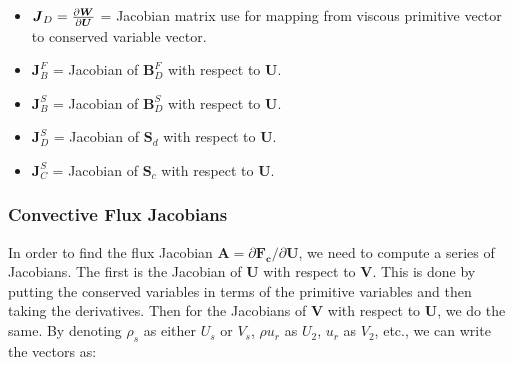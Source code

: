 \documentclass[10pt]{article}
\begin{document}
\begin{flushleft}
\begin{itemize}
    \item $\boldsymbol{J}_D = \frac{\partial \boldsymbol{W}}{\partial \boldsymbol{U}}$ = Jacobian matrix  use for mapping from viscous primitive vector to conserved variable vector.
    \item $\boldsymbol{J}_B^F$ = Jacobian of $\boldsymbol{B}_D^F$ with respect to $\boldsymbol{U}$.
    \item $\boldsymbol{J}_B^S$ = Jacobian of $\boldsymbol{B}_D^S$ with respect to $\boldsymbol{U}$.
    \item $\boldsymbol{J}_D^S$ = Jacobian of $\boldsymbol{S}_d$ with respect to $\boldsymbol{U}$.
    \item $\boldsymbol{J}_C^S$ = Jacobian of $\boldsymbol{S}_c$ with respect to $\boldsymbol{U}$.
\end{itemize}

\subsubsection{Convective Flux Jacobians}

In order to find the flux Jacobian $\boldsymbol{A} = \partial{\boldsymbol{F_c}}/\partial{\boldsymbol{U}}$, we need to compute a series of Jacobians. The first is the Jacobian of $\boldsymbol{U}$ with respect to $\boldsymbol{V}$. This is done by putting the conserved variables in terms of the primitive variables and then taking the derivatives. Then for the Jacobians of $\boldsymbol{V}$ with respect to $\boldsymbol{U}$, we do the same. By denoting $\rho_s$ as either $U_s$ or $V_s$, $\rho u_r$ as $U_2$, $u_r$ as $V_2$, etc., we can write the vectors as:


\end{flushleft}
\end{document}
